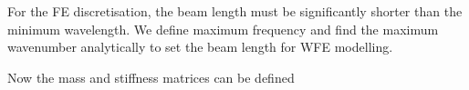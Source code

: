\documentclass[letterpaper,10pt,english]{sphinxmanual}
\begin{document}
\sphinxAtStartPar
For the FE discretisation, the beam length must be significantly shorter than the minimum wavelength. We define maximum frequency and find the maximum wavenumber analytically to set the beam length for WFE modelling.

\begin{sphinxVerbatim}[commandchars=\\\{\}]
    
    
      

     
\end{sphinxVerbatim}

\sphinxAtStartPar
Now the mass and stiffness matrices can be defined
\end{document}
